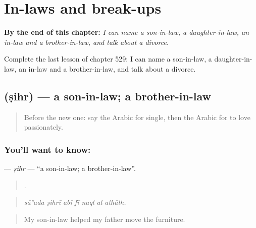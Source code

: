 
\chapter{In-laws and break-ups}
\label{ch:ar-in-laws-and-break-ups}

\begin{chapteropening}
\textbf{By the end of this chapter:} \emph{I can name a son-in-law, a daughter-in-law, an in-law and a brother-in-law, and talk about a divorce.}

Complete the last lesson of chapter 529: I can name a son-in-law, a daughter-in-law, an in-law and a brother-in-law, and talk about a divorce.
\end{chapteropening}

\section[\texorpdfstring{\ar{صهر} (ṣihr)}{صهر (ṣihr)}]{ (ṣihr) — a son-in-law; a brother-in-law}

\label{lesson:AR-C529-sihr}



\begin{quote}
Before the new one: say the Arabic for single, then the Arabic for to love passionately.
\end{quote}

\subsection*{You'll want to know: }
\textbf{} — \emph{ṣihr} — \textquotedblleft{}a son-in-law; a brother-in-law\textquotedblright{}.

\begin{quote}
     .
\end{quote}

\begin{quote}
\emph{sāʿada ṣihrī abī fī naql al-athāth.}
\end{quote}

\begin{quote}
My son-in-law helped my father move the furniture.
\end{quote}

